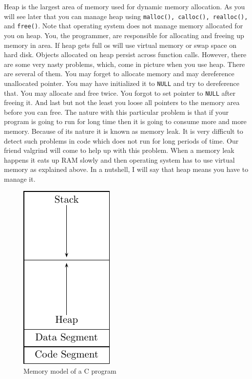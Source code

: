 Heap is the largest area of memory used for dynamic memory allocation. As
you will see later that you can manage heap using \texttt{malloc(), calloc(),
realloc(),} and \texttt{free()}. Note that operating system does not manage memory
allocated for you on heap. You, the programmer, are responsible for allocating and
freeing up memory in area. If heap gets full os will use virtual memory or swap
space on hard disk. Objects allocated on heap persist across function
calls. However, there are some very nasty problems, which, come in picture when
you use heap. There are several of them. You may forget to allocate memory and
may dereference unallocated pointer. You may have initialized it to
\texttt{NULL} and try to dereference that. You may allocate and free twice. You
forgot to set pointer to \texttt{NULL} after freeing it. And last but not the
least you loose all pointers to the memory area before you can free. The nature
with this particular problem is that if your program is going to run for long
time then it is going to consume more and more memory. Because of its nature it
is known as memory leak. It is very difficult to detect such problems in code
which does not run for long periods of time. Our friend valgrind will come to
help up with this problem. When a memory leak happens it eats up RAM slowly and
then operating system has to use virtual memory as explained above. In a
nutshell, I will say that heap means you have to manage it.

\begin{figure}[t!]
\begin{center}
\includegraphics{figs/mem_model.pdf}
\end{center}
\caption{Memory model of a C program}
\end{figure}

